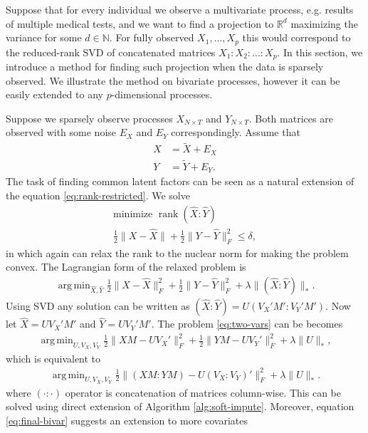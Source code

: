 \documentclass[preprint]{imsart}
\numberwithin{equation}{section}
\theoremstyle{plain}
\newcommand{\R}{\mathbb{R}}
\newcommand{\N}{\mathbb{N}}
\DeclareMathOperator*{\argmin}{arg\,min}
\DeclareMathOperator*{\rank}{rank}
\begin{document}
Suppose that for every individual we observe a multivariate process, e.g. results of multiple medical tests, and we want to find a projection to $\R^d$ maximizing the variance for some $d \in \N$. For fully observed $X_1,...,X_p$ this would correspond to the reduced-rank SVD of concatenated matrices $X_1:X_2:...:X_p$. In this section, we introduce a method for finding such projection when the data is sparsely observed. We illustrate the method on bivariate processes, however it can be easily extended to any $p$-dimensional processes. 

Suppose we sparsely observe processes $X_{N\times T}$ and $Y_{N\times T}$. Both matrices are observed with some noise $E_X$ and $E_Y$ correspondingly. Assume that 
\begin{align*}
X &= \tilde{X} + E_X\\
Y &= \tilde{Y} + E_Y.
\end{align*}
The task of finding common latent factors can be seen as a natural extension of the equation \eqref{eq:rank-restricted}. We solve
\begin{gather*}
\text{minimize } \rank{(\hat{X}:\hat{Y})} \\
\frac{1}{2} \| X - \hat{X} \| + \frac{1}{2} \| Y - \hat{Y} \|_F^2 \leq \delta,
\end{gather*}
in which again can relax the rank to the nuclear norm for making the problem convex. The Lagrangian form of the relaxed problem is
\begin{gather}
\argmin_{\hat{X},\hat{Y}} \frac{1}{2} \| X - \hat{X} \|_F^2 + \frac{1}{2}\| Y - \hat{Y} \|_F^2 + \lambda \| (\hat{X} : \hat{Y}) \|_*.\label{eq:two-vars}
\end{gather}
Using SVD any solution can be written as $(\hat{X} : \hat{Y}) = U (V_X'M' : V_Y'M')$. Now let $\hat{X} = UV_X'M'$ and $\hat{Y} = UV_Y'M'$. 
The problem \eqref{eq:two-vars} can be becomes
\begin{align*}
\argmin_{U,V_X,V_Y} \frac{1}{2} \| XM - U V_X' \|_F^2 + \frac{1}{2} \| YM - U V_Y' \|_F^2 + \lambda\|U\|_*,
\end{align*}
which is equivalent to
\begin{align}\label{eq:final-bivar}
\argmin_{U,V_X,V_Y} \frac{1}{2} \| (XM:YM) - U (V_X:V_Y)' \|_F^2 + \lambda\|U\|_*.
\end{align}
where $(\cdot:\cdot)$ operator is concatenation of matrices column-wise. This can be solved using direct extension of Algorithm \ref{alg:soft-impute}. Moreover, equation \eqref{eq:final-bivar} suggests an extension to more covariates
\end{document}
